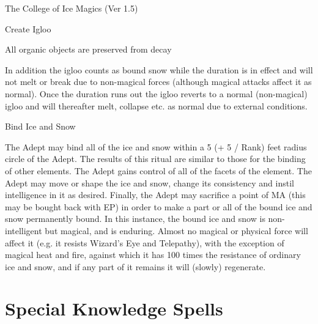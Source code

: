 \begin{Chapter}{The College of Ice Magics (Ver 1.5)}
\begin{ritual}[Q-1]{Create Igloo}
\begin{effects}
\begin{Itemize}
\item All organic objects are preserved from decay
\end{Itemize}

In addition the igloo counts as bound snow while the duration is in
effect and will not melt or break due to non-magical forces (although
magical attacks affect it as normal).  Once the duration runs out
the igloo reverts to a normal (non-magical) igloo and will thereafter
melt, collapse etc.  as normal due to external conditions.
\end{effects}
\end{ritual}

\begin{ritual}[Q-2]{Bind Ice and Snow}
\begin{effects}
The Adept may bind all of the ice and snow within a 5 (+ 5 / Rank)
feet radius circle of the Adept.  The results of this ritual are
similar to those for the binding of other elements. The Adept gains
control of all of the facets of the element.  The Adept may move or
shape the ice and snow, change its consistency and instil intelligence
in it as desired.  Finally, the Adept may sacrifice a point of MA
(this may be bought back with EP) in order to make a part or all of
the bound ice and snow permanently bound. In this instance, the bound
ice and snow is non-intelligent but magical, and is enduring. Almost
no magical or physical force will affect it (e.g.  it resists Wizard’s
Eye and Telepathy), with the exception of magical heat and fire,
against which it has 100 times the resistance of ordinary ice and
snow, and if any part of it remains it will (slowly) regenerate.
\end{effects}
\end{ritual}


\section{Special Knowledge Spells}


\end{Chapter}

